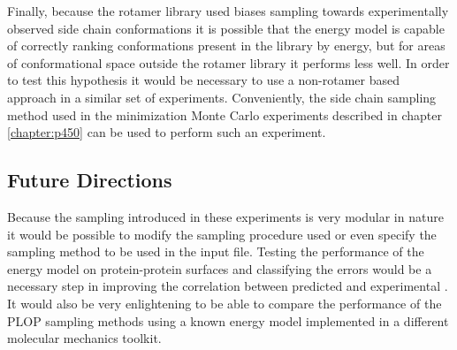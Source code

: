 Finally, because the rotamer library used biases sampling towards experimentally observed side chain conformations it is possible that the energy model is capable of correctly ranking conformations present in the library by energy, but for areas of conformational space outside the rotamer library it performs less well.
In order to test this hypothesis it would be necessary to use a non-rotamer based approach in a similar set of experiments.
Conveniently, the side chain sampling method used in the minimization Monte Carlo experiments described in chapter \ref{chapter:p450} can be used to perform such an experiment.

\subsection{Future Directions}
Because the sampling introduced in these experiments is very modular in nature it would be possible to modify the sampling procedure used or even specify the sampling method to be used in the input file.
Testing the performance of the energy model on protein-protein surfaces and classifying the errors would be a necessary step in improving the correlation between predicted and experimental \ddg.
It would also be very enlightening to be able to compare the performance of the PLOP sampling methods using a known energy model implemented in a different molecular mechanics toolkit.

